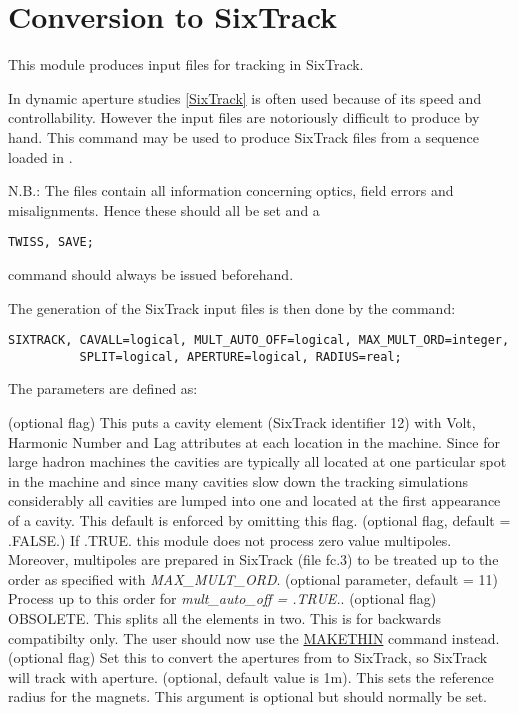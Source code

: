 
\chapter{Conversion to SixTrack}
\label{chap:sixtrack}

This module produces input files for tracking in SixTrack.

In dynamic aperture studies
\href{../Introduction/bibliography.html#SixTrack}{[SixTrack]} is often
used because of its  speed and controllability. However the input files
are notoriously difficult  to produce by hand. This command may be used
to produce SixTrack files from a sequence loaded in \madx.
 
 N.B.: The files contain all information concerning optics, field errors
 and misalignments. Hence these should all be set and a   
\begin{verbatim}
TWISS, SAVE;
\end{verbatim} 
command should always be issued beforehand.

 The generation of the SixTrack input files is then done by the command: 
\begin{verbatim}
SIXTRACK, CAVALL=logical, MULT_AUTO_OFF=logical, MAX_MULT_ORD=integer,
          SPLIT=logical, APERTURE=logical, RADIUS=real;
\end{verbatim} 

The parameters are defined as: 
\begin{madlist}
    (optional flag) This puts a cavity element (SixTrack
     identifier 12) with Volt, Harmonic Number and Lag attributes at
     each location in the machine. Since for large hadron machines the
     cavities are typically all located at one particular spot in the
     machine and since many cavities slow down the tracking simulations
     considerably all cavities are lumped into one and located at the
     first appearance of a cavity. This default is enforced by omitting
     this flag.  
    (optional flag, default = .FALSE.) If
     .TRUE. this module does not process zero value
     multipoles. Moreover, multipoles are prepared in SixTrack (file
     fc.3) to be treated up to the order as specified with
     \textit{MAX\_MULT\_ORD}.  
    (optional parameter, default = 11) Process up
     to this order for \textit{ mult\_auto\_off = .TRUE.}.  
    (optional flag) OBSOLETE. This splits all the
     elements in  two. This is for backwards compatibilty only. The user
     should now use the  \href{../makethin/makethin.html}{MAKETHIN}
     command instead.  
    (optional flag) Set this to convert the apertures
     from \madx to SixTrack, so SixTrack will track with aperture.  
    (optional, default value is 1m). This sets the
     reference  radius for the magnets. This argument is optional but
     should normally  be set.  
\end{madlist}

